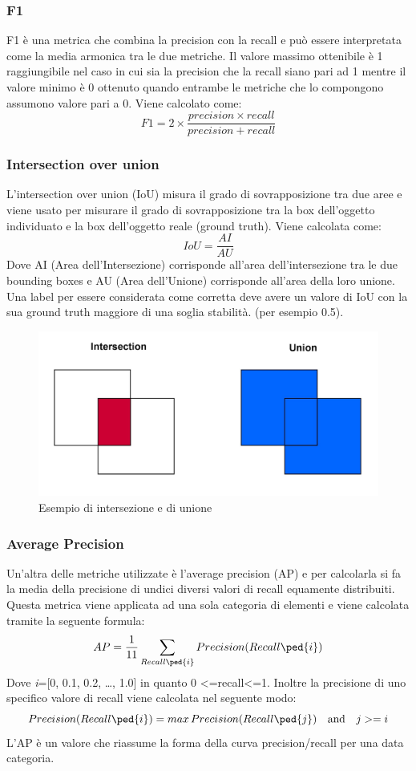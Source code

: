 \subsubsection{F1}
F1 è una metrica che combina la precision con la recall e può essere interpretata come la media armonica tra le due metriche. Il valore massimo ottenibile è 1 raggiungibile nel caso in cui sia la precision che la recall siano pari ad 1 mentre il valore minimo è 0 ottenuto quando entrambe le metriche che lo compongono assumono valore pari a 0. Viene calcolato come:
\[
    F1 = 2 \times \frac{precision \times recall}{precision + recall}
\]
\subsubsection{Intersection over union}
L'intersection over union (IoU) misura il grado di sovrapposizione tra due aree e viene usato per misurare il grado di sovrapposizione tra la box dell'oggetto individuato e la box dell'oggetto reale (ground truth). Viene calcolata come:
\[
    IoU = \frac{AI}{AU}
\]
Dove AI (Area dell'Intersezione) corrisponde all'area dell'intersezione tra le due bounding boxes e AU (Area dell'Unione) corrisponde all'area della loro unione.
Una label per essere considerata come corretta deve avere un valore di IoU con la sua ground truth maggiore di una soglia stabilità. (per esempio 0.5).
\begin{figure}[H]
	\centering
	\includegraphics[width=0.5\linewidth]{images/unione-intersezione.jpg}
	\caption{Esempio di intersezione e di unione}
	\label{Esempio di intersezione e di unione}
\end{figure}
\subsubsection{Average Precision}
Un'altra delle metriche utilizzate è l'average precision (AP) e per calcolarla si fa la media della precisione di undici diversi valori di recall equamente distribuiti. Questa metrica viene applicata ad una sola categoria di elementi e viene calcolata tramite la seguente formula:
\[
    AP = \frac{1}{11}\sum_{Recall\ped{i}}^{} Precision(Recall\ped{i})
\]
Dove \textit{i}=[0, 0.1, 0.2, …, 1.0] in quanto 0 \textless =recall\textless =1. Inoltre la precisione di uno specifico valore di recall viene calcolata nel seguente modo:
\[
    Precision(Recall\ped{i}) = max\,Precision(Recall\ped{j}) \quad \textrm{and} \quad j>=i
\]
L'AP è un valore che riassume la forma della curva precision/recall per una data categoria.
